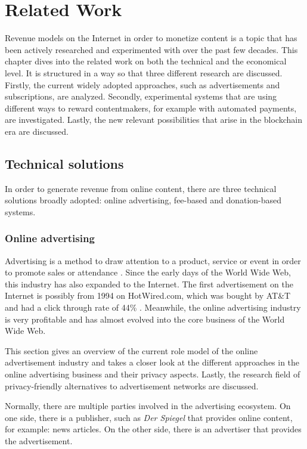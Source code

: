 \chapter{Related Work}
\label{cha:relatedwork}

Revenue models on the Internet in order to monetize content is a topic that has been actively researched and experimented with over the past few decades. This chapter dives into the related work on both the technical and the economical level. It is structured in a way so that three different research are discussed.
Firstly, the current widely adopted approaches, such as advertisements and subscriptions, are analyzed. Secondly, experimental systems that are using different ways to reward contentmakers, for example with automated payments, are investigated. Lastly, the new relevant possibilities that arise in the blockchain era are discussed.

\section{Technical solutions}

In order to generate revenue from online content, there are three technical solutions broadly adopted: online advertising, fee-based and donation-based systems.

\subsection{Online advertising}
Advertising is a method to draw attention to a product, service or event in order to promote sales or attendance \cite{stanton1994fundamentals}. Since the early days of the World Wide Web, this industry has also expanded to the Internet. The first advertisement on the Internet is possibly from 1994 on HotWired.com, which was bought by AT\&T and had a click through rate of 44\% \cite{firstbanner}. Meanwhile, the online advertising industry is very profitable and has almost evolved into the core business of the World Wide Web.

This section gives an overview of the current role model of the online advertisement industry and takes a closer look at the different approaches in the online advertising business and their privacy aspects. Lastly, the research field of privacy-friendly alternatives to advertisement networks are discussed.

Normally, there are multiple parties involved in the advertising ecosystem. On one side, there is a publisher, such as \textit{Der Spiegel} that provides online content, for example: news articles. On the other side, there is an advertiser that provides the advertisement.

